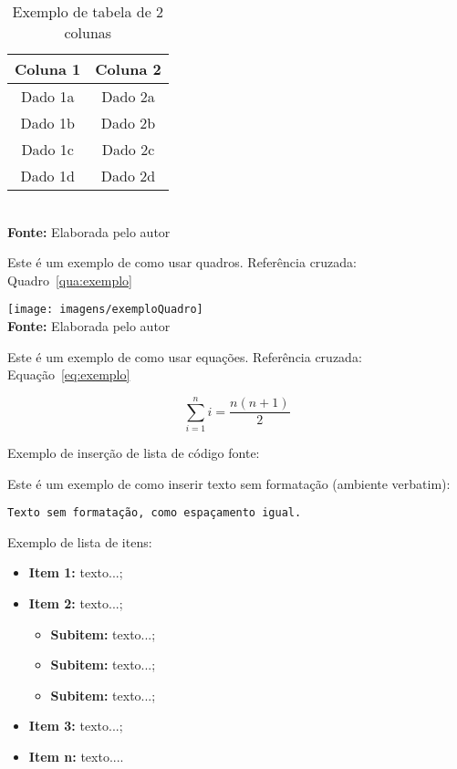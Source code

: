 \FloatBarrier
\begin{table}[!htbp]
	\centering
	\caption{Exemplo de tabela de 2 colunas}
	\begin{tabular}{ c | c }
		\hline
		\textbf{Coluna 1} & \textbf{Coluna 2} \\ \hline
		Dado 1a           & Dado 2a           \\ \hline
		Dado 1b           & Dado 2b           \\ \hline
		Dado 1c           & Dado 2c           \\ \hline
		Dado 1d           & Dado 2d           \\ \hline
	\end{tabular}
	\\ \vspace{0.2cm}
	\textbf{Fonte:} Elaborada pelo autor
	\label{tab:exemplo}
\end{table}
\FloatBarrier


Este é um exemplo de como usar quadros. Referência cruzada: Quadro~\ref{qua:exemplo}

\FloatBarrier
\begin{quadro}[!htbp]
	\centering
	\caption{Exemplo de quadro}
	\texttt{[image: imagens/exemploQuadro]}
	\\\textbf{Fonte:} Elaborada pelo autor
	\label{qua:exemplo}
\end{quadro}
\FloatBarrier


Este é um exemplo de como usar equações. Referência cruzada: Equação~\ref{eq:exemplo}

\begin{equation}
\sum_{i=1}^{n} i = \frac{n(n+1)}{2}
\label{eq:exemplo}
\end{equation}


Exemplo de inserção de lista de código fonte:

 



Este é um exemplo de como inserir texto sem formatação (ambiente verbatim):

\begin{verbatim}
Texto sem formatação, como espaçamento igual.
\end{verbatim}


Exemplo de lista de itens:

\begin{itemize}
	\item \textbf{Item 1:} texto...;
	\item \textbf{Item 2:} texto...;
	\begin{itemize}
		\item \textbf{Subitem:} texto...;
		\item \textbf{Subitem:} texto...;
		\item \textbf{Subitem:} texto...;
	\end{itemize}
	\item \textbf{Item 3:} texto...;
	\item \textbf{Item n:} texto....
\end{itemize}


